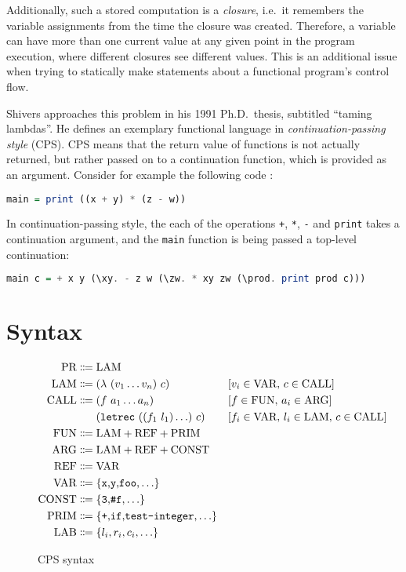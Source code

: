 \documentclass[a4paper,parskip=half,BCOR=8mm,DIV=calc,12pt]{scrbook}
\begin{document}
Additionally, such a stored computation is a \textit{closure}, i.e.\ it remembers the variable  assignments from the time the closure was created. Therefore, a variable can have more than one current value at any given point in the program execution, where different closures see different values. This is an additional issue when trying to statically make statements about a functional program’s control flow.

Shivers approaches this problem in his 1991 Ph.D.\ thesis, subtitled “taming lambdas”. He defines an exemplary functional language in \textit{continuation-passing style} (CPS). CPS means that the return value of functions is not actually returned, but rather passed on to a continuation function, which is provided as an argument. Consider for example the following code :
\begin{lstlisting}[language=Haskell]
main = print ((x + y) * (z - w))
\end{lstlisting}
In continuation-passing style, the each of the operations \lstinline!+!, \lstinline!*!, \lstinline!-! and \lstinline!print! takes a continuation argument, and the \lstinline!main! function is being passed a top-level continuation: 
\begin{lstlisting}[language=Haskell]
main c = + x y (\xy. - z w (\zw. * xy zw (\prod. print prod c)))
\end{lstlisting}

\section{Syntax}

\begin{figure}
\begin{framed}
\begin{align*}
\text{PR} &\Coloneqq \text{LAM} \\
\text{LAM} &\Coloneqq (\lambda\ (v_1\ldots v_n)\ c) && [v_i\in \text{VAR},\, c\in\text{CALL}] \\
\text{CALL} &\Coloneqq (f\ a_1 \ldots a_n) && [f\in \text{FUN},\, a_i\in\text{ARG}] \\
&\phantom{\strut\Coloneqq\strut} (\text{\texttt{letrec}}\ ((f_1\ l_1)\ldots)\ c) && [f_i\in \text{VAR},\,l_i\in\text{LAM},\,c\in\text{CALL}] \\
\text{FUN} &\Coloneqq \text{LAM} + \text{REF} + \text{PRIM} \\
\text{ARG} &\Coloneqq \text{LAM} + \text{REF} + \text{CONST} \\
\text{REF} &\Coloneqq \text{VAR} \\
\text{VAR} &\Coloneqq \{\text{\texttt{x},\texttt{y},\texttt{foo},}\ldots\} \\
\text{CONST} &\Coloneqq \{\text{\texttt{3},\texttt{\#f},}\ldots\} \\
\text{PRIM} &\Coloneqq \{\text{\texttt{+},\texttt{if},\texttt{test-integer},}\ldots\} \\
\text{LAB} &\Coloneqq \{l_i,r_i,c_i,\ldots\} %
\end{align*}
\end{framed}
\caption{CPS syntax}
\label{fig:syntax}
\end{figure}
\end{document}
